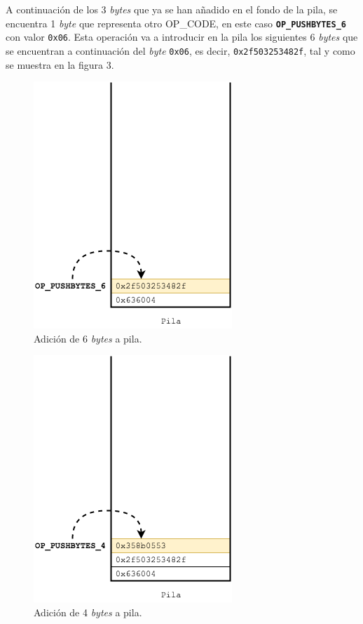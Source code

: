 \documentclass{article}
\begin{document}
    \vspace{1mm}
    
    A continuación de los 3 \textit{bytes} que ya se han añadido en el fondo de la pila, se encuentra 1 \textit{byte} que representa otro OP\_CODE, en este caso \textbf{\texttt{OP\_PUSHBYTES\_6}} con valor \texttt{0x06}. Esta operación va a introducir en la pila los siguientes 6 \textit{bytes} que se encuentran a continuación del \textit{byte} \texttt{0x06}, es decir, \texttt{0x2f503253482f}, tal y como se muestra en la figura 3.
    
    \vspace{1mm}
    \noindent
    \begin{minipage}{0.50\textwidth}
        \begin{figure}[H]
        \centering
            \includegraphics[scale=0.49]{img/Bitcoin_transactions_stack_02.png}
            \caption{Adición de 6 \textit{bytes} a pila.}
        \end{figure}
    \end{minipage}
    \hfill
    \noindent
    \begin{minipage}{0.50\textwidth}
        \begin{figure}[H]
        \centering
            \includegraphics[scale=0.49]{img/Bitcoin_transactions_stack_03.png}
            \caption{Adición de 4 \textit{bytes} a pila.}
        \end{figure}
    \end{minipage}
    
\end{document}
